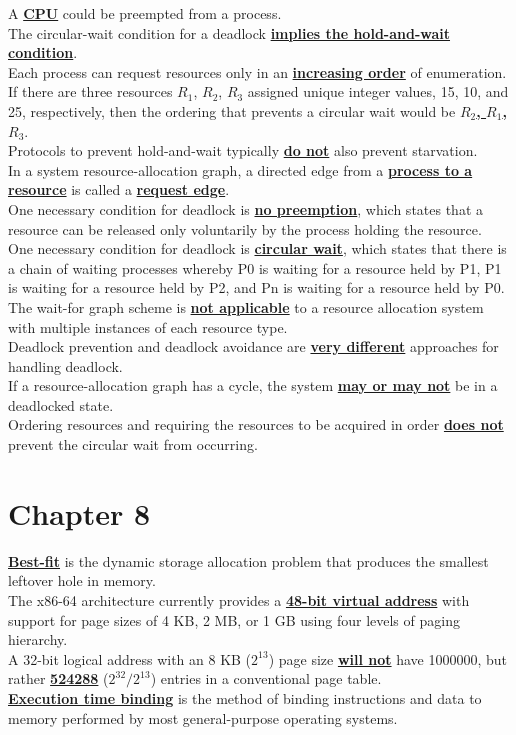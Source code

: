 \documentclass[10pt]{article}
\newcommand{\qw}[1]{\textbf{\ul{#1}}}
\begin{document}
A \qw{CPU} could be preempted from a process.\\[2mm]
The circular-wait condition for a deadlock \qw{implies the hold-and-wait condition}.\\[2mm]
Each process can request resources only in an \qw{increasing order} of enumeration. If there are three resources $R_1$, $R_2$, $R_3$ assigned unique integer values, 15, 10, and 25, respectively, then the ordering that prevents a circular wait would be \qw{$R_2$, $R_1$, $R_3$}.\\[2mm]
Protocols to prevent hold-and-wait typically \qw{do not} also prevent starvation.\\[2mm]
In a system resource-allocation graph, a directed edge from a \qw{process to a resource} is called a \qw{request edge}.\\[2mm]
One necessary condition for deadlock is \qw{no preemption}, which states that a resource can be released only voluntarily by the process holding the resource.\\[2mm]
One necessary condition for deadlock is \qw{circular wait}, which states that there is a chain of waiting processes whereby P0 is waiting for a resource held by P1, P1 is waiting for a resource held by P2, and Pn is waiting for a resource held by P0.\\[2mm]
The wait-for graph scheme is \qw{not applicable} to a resource allocation system with multiple instances of each resource type.\\[2mm]
Deadlock prevention and deadlock avoidance are \qw{very different} approaches for handling deadlock.\\[2mm]
If a resource-allocation graph has a cycle, the system \qw{may or may not} be in a deadlocked state.\\[2mm]
Ordering resources and requiring the resources to be acquired in order \qw{does not} prevent the circular wait from occurring.

\section*{\centering Chapter 8}
\qw{Best-fit} is the dynamic storage allocation problem that produces the smallest leftover hole in memory.\\[2mm]
The x86-64 architecture currently provides a \qw{48-bit virtual address} with support for page sizes of 4 KB, 2 MB, or 1 GB using four levels of paging hierarchy.\\[2mm]
A 32-bit logical address with an 8 KB ($2^{13}$) page size \qw{will not} have 1000000, but rather \qw{524288} ($2^{32}/2^{13}$) entries in a conventional page table.\\[2mm]
\qw{Execution time binding} is the method of binding instructions and data to memory performed by most general-purpose operating systems.\\[2mm]
\newpage
\end{document}
